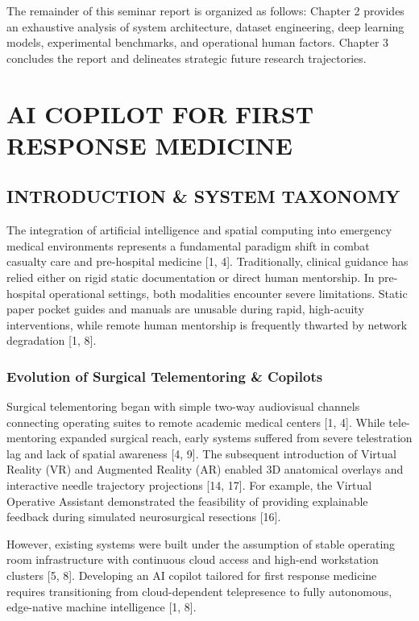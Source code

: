 \documentclass[12pt,a4paper]{report}
\begin{document}
The remainder of this seminar report is organized as follows: Chapter 2 provides an exhaustive analysis of system architecture, dataset engineering, deep learning models, experimental benchmarks, and operational human factors. Chapter 3 concludes the report and delineates strategic future research trajectories.

\newpage
\chapter{AI COPILOT FOR FIRST RESPONSE MEDICINE}

\section{INTRODUCTION \& SYSTEM TAXONOMY}

The integration of artificial intelligence and spatial computing into emergency medical environments represents a fundamental paradigm shift in combat casualty care and pre-hospital medicine [1, 4]. Traditionally, clinical guidance has relied either on rigid static documentation or direct human mentorship. In pre-hospital operational settings, both modalities encounter severe limitations. Static paper pocket guides and manuals are unusable during rapid, high-acuity interventions, while remote human mentorship is frequently thwarted by network degradation [1, 8].

\subsection{Evolution of Surgical Telementoring \& Copilots}
Surgical telementoring began with simple two-way audiovisual channels connecting operating suites to remote academic medical centers [1, 4]. While tele-mentoring expanded surgical reach, early systems suffered from severe telestration lag and lack of spatial awareness [4, 9]. The subsequent introduction of Virtual Reality (VR) and Augmented Reality (AR) enabled 3D anatomical overlays and interactive needle trajectory projections [14, 17]. For example, the Virtual Operative Assistant demonstrated the feasibility of providing explainable feedback during simulated neurosurgical resections [16]. 

However, existing systems were built under the assumption of stable operating room infrastructure with continuous cloud access and high-end workstation clusters [5, 8]. Developing an AI copilot tailored for first response medicine requires transitioning from cloud-dependent telepresence to fully autonomous, edge-native machine intelligence [1, 8].
\end{document}
